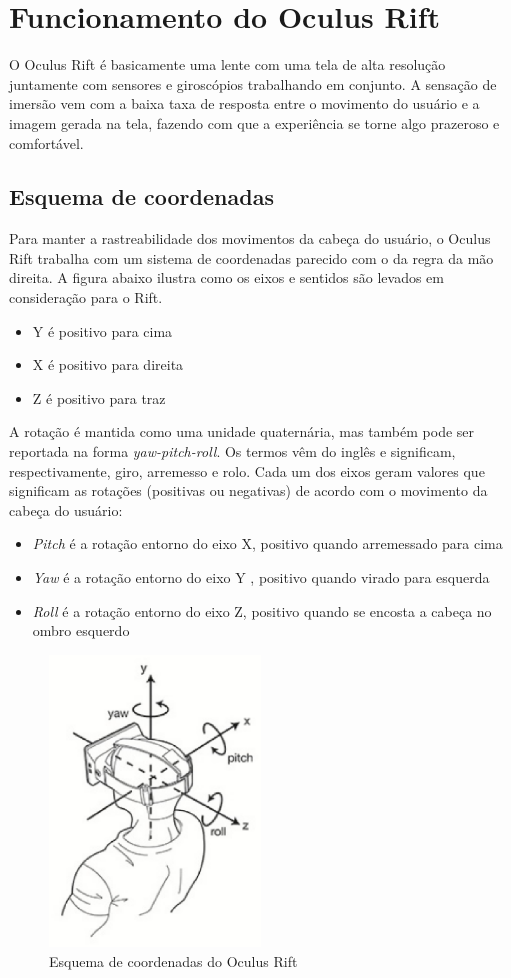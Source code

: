 \section{Funcionamento do Oculus Rift}
O Oculus Rift é basicamente uma lente com uma tela de alta resolução juntamente com sensores e giroscópios trabalhando em conjunto. A sensação de imersão vem com a baixa taxa de resposta entre o movimento do usuário e a imagem gerada na tela, fazendo com que a experiência se torne algo prazeroso e comfortável.

\subsection{Esquema de coordenadas}
Para manter a rastreabilidade dos movimentos da cabeça do usuário, o Oculus Rift trabalha com um sistema de coordenadas parecido com o da regra da mão direita. A figura abaixo ilustra como os eixos e sentidos são levados em consideração para o Rift.
\begin{itemize}
  \item Y é positivo para cima
  \item X é positivo para direita
  \item Z é positivo para traz
\end{itemize}
A rotação é mantida como uma unidade quaternária, mas também pode ser reportada na forma \textit{yaw-pitch-roll}. Os termos vêm do inglês e significam, respectivamente, giro, arremesso e rolo. Cada um dos eixos geram valores que significam as rotações (positivas ou negativas) de acordo com o movimento da cabeça do usuário:
\begin{itemize}
  \item \textit{Pitch} é a rotação entorno do eixo X, positivo quando arremessado para cima
  \item \textit{Yaw} é a rotação entorno do eixo Y , positivo quando virado para esquerda
  \item \textit{Roll} é a rotação entorno do eixo Z, positivo quando se encosta a cabeça no ombro esquerdo
\end{itemize}

\begin{figure}[h]
  \centering
  \includegraphics[width=0.5\textwidth]
      {figuras/esquema_coordenadas_rift.eps}
  \caption{Esquema de coordenadas do Oculus Rift}
  \label{coordenadas-rift}
\end{figure}

